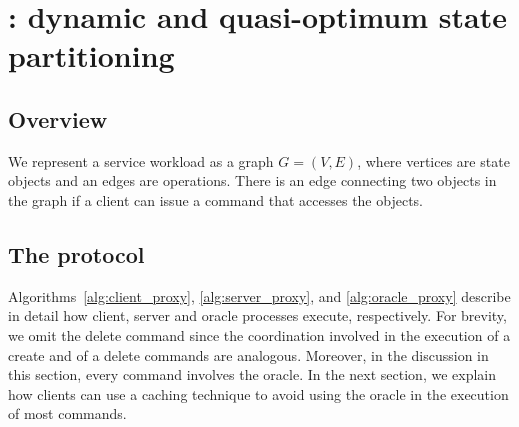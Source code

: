 \section{\dynastar: dynamic and quasi-optimum state partitioning}


\subsection{Overview}

We represent a service workload as a graph $G = (V, E)$, where vertices are state objects and an edges are operations.
There is an edge connecting two objects in the graph if a client can issue a command that accesses the objects. 




\subsection{The \dynastar protocol}

Algorithms~\ref{alg:client_proxy}, \ref{alg:server_proxy}, and \ref{alg:oracle_proxy} describe in detail how client, server and oracle processes execute, respectively.
For brevity, we omit the delete command since the coordination involved in the execution of a create and of a delete commands are analogous. 
Moreover, in the discussion in this section, every command involves the oracle.
In the next section, we explain how clients can use a caching technique to avoid using the oracle in the execution of most commands.

